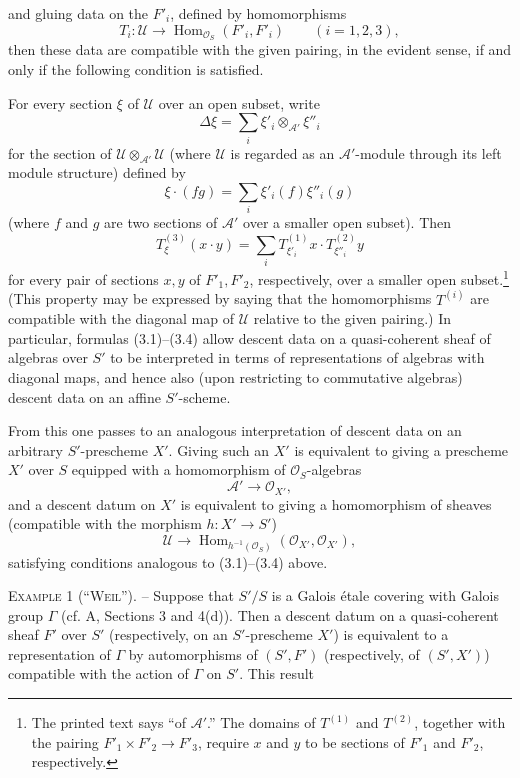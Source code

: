 and gluing data on the $F'_i$, defined by homomorphisms
\[
  T_i:\mathcal U\longrightarrow
  \operatorname{Hom}_{\mathcal O_S}(F'_i,F'_i)
  \qquad (i=1,2,3),
\]
then these data are compatible with the given pairing, in the evident sense,
if and only if the following condition is satisfied.

For every section $\xi$ of $\mathcal U$ over an open subset, write
\[
  \Delta\xi=\sum_i\xi'_i\otimes_{\mathcal A'}\xi''_i
\]
for the section of $\mathcal U\otimes_{\mathcal A'}\mathcal U$ (where
$\mathcal U$ is regarded as an $\mathcal A'$-module through its left module
structure) defined by
\[
  \xi\mathbin{\cdot}(fg)=\sum_i\xi'_i(f)\xi''_i(g)
\]
(where $f$ and $g$ are two sections of $\mathcal A'$ over a smaller open
subset). Then
\begin{equation}
  T^{(3)}_\xi(x\mathbin{\cdot}y)
  =\sum_iT^{(1)}_{\xi'_i}x\mathbin{\cdot}T^{(2)}_{\xi''_i}y
  \tag{3.4}
\end{equation}
for every pair of sections $x,y$ of $F'_1,F'_2$, respectively, over a smaller
open subset.\footnote{The printed text says “of $\mathcal A'$.” The domains of
$T^{(1)}$ and $T^{(2)}$, together with the pairing
$F'_1\times F'_2\longrightarrow F'_3$, require $x$ and $y$ to be sections of
$F'_1$ and $F'_2$, respectively.} (This property may be expressed by saying
that the homomorphisms $T^{(i)}$ are compatible with the diagonal map of
$\mathcal U$ relative to the given pairing.) In particular, formulas
(3.1)--(3.4) allow descent data on a quasi-coherent sheaf of algebras over $S'$
to be interpreted in terms of representations of algebras with diagonal maps,
and hence also (upon restricting to commutative algebras) descent data on an
affine $S'$-scheme.

From this one passes to an analogous interpretation of descent data on an
arbitrary $S'$-prescheme $X'$. Giving such an $X'$ is equivalent to giving a
prescheme $X'$ over $S$ equipped with a homomorphism of $\mathcal O_S$-algebras
\[
  \mathcal A'\longrightarrow\mathcal O_{X'},
\]
and a descent datum on $X'$ is equivalent to giving a homomorphism of sheaves
(compatible with the morphism $h:X'\longrightarrow S'$)
\[
  \mathcal U\longrightarrow
  \operatorname{Hom}_{h^{-1}(\mathcal O_S)}
  (\mathcal O_{X'},\mathcal O_{X'}),
\]
satisfying conditions analogous to (3.1)--(3.4) above.

\textsc{Example 1 (“Weil”).} -- Suppose that $S'/S$ is a Galois étale covering
with Galois group $\Gamma$ (cf. A, Sections 3 and 4(d)). Then a descent datum on
a quasi-coherent sheaf $F'$ over $S'$ (respectively, on an $S'$-prescheme $X'$)
is equivalent to a representation of $\Gamma$ by automorphisms of $(S',F')$
(respectively, of $(S',X')$) compatible with the action of $\Gamma$ on $S'$.
This result

